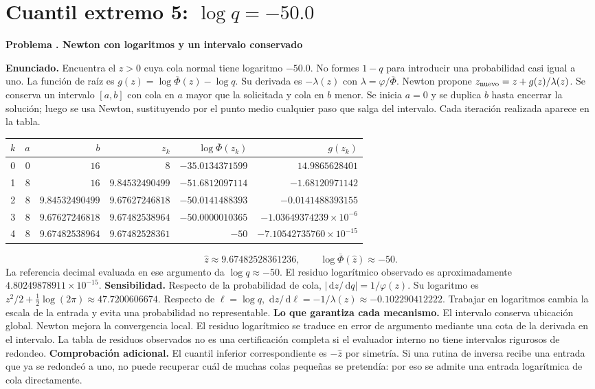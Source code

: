 \documentclass[11pt,a4paper]{article}
\newcommand{\dd}{\,\mathrm d}
\theoremstyle{definition}
\newcounter{problema}
\newenvironment{resuelto}[1]{\refstepcounter{problema}\par\medskip\Needspace{6\baselineskip}\textbf{Problema \theproblema. #1}\par}{\par\medskip}
\newcommand{\SF}{\overline\Phi}
\begin{document}
\section{\texorpdfstring{Cuantil extremo 5: $\log q=-50.0$}{Cuantil extremo 5: log q=-50.0}}
\begin{resuelto}{Newton con logaritmos y un intervalo conservado}
\textbf{Enunciado.} Encuentra el $z>0$ cuya cola normal tiene logaritmo $-50.0$. No formes $1-q$ para introducir una probabilidad casi igual a uno.
La función de raíz es $g(z)=\log\SF(z)-\log q$. Su derivada es $-\lambda(z)$ con $\lambda=\varphi/\SF$. Newton propone $z_{\rm nuevo}=z+g(z)/\lambda(z)$. Se conserva un intervalo $[a,b]$ con cola en $a$ mayor que la solicitada y cola en $b$ menor.
Se inicia $a=0$ y se duplica $b$ hasta encerrar la solución; luego se usa Newton, sustituyendo por el punto medio cualquier paso que salga del intervalo. Cada iteración realizada aparece en la tabla.

\begin{center}\small\begin{tabular}{rrrrrr}
\toprule
$k$&$a$&$b$&$z_k$&$\log\SF(z_k)$&$g(z_k)$\\
\midrule
0&$0$&$16$&$8$&$-35.0134371599$&$14.9865628401$\\
1&$8$&$16$&$9.84532490499$&$-51.6812097114$&$-1.68120971142$\\
2&$8$&$9.84532490499$&$9.67627246818$&$-50.0141488393$&$-0.0141488393155$\\
3&$8$&$9.67627246818$&$9.67482538964$&$-50.0000010365$&$-1.03649374239\times10^{-6}$\\
4&$8$&$9.67482538964$&$9.67482528361$&$-50$&$-7.10542735760\times10^{-15}$\\
\bottomrule\end{tabular}\end{center}
\[
\widehat z\approx9.67482528361236,\qquad \log\SF(\widehat z)\approx-50.
\]
La referencia decimal evaluada en ese argumento da $\log q\approx-50$. El residuo logarítmico observado es aproximadamente $4.80249878911\times10^{-15}$.
\textbf{Sensibilidad.} Respecto de la probabilidad de cola, $|\dd z/\dd q|=1/\varphi(z)$. Su logaritmo es $z^2/2+\tfrac12\log(2\pi)\approx47.7200606674$. Respecto de $\ell=\log q$, $\dd z/\dd\ell=-1/\lambda(z)\approx-0.102290412222$. Trabajar en logaritmos cambia la escala de la entrada y evita una probabilidad no representable.
\textbf{Lo que garantiza cada mecanismo.} El intervalo conserva ubicación global. Newton mejora la convergencia local. El residuo logarítmico se traduce en error de argumento mediante una cota de la derivada en el intervalo. La tabla de residuos observados no es una certificación completa si el evaluador interno no tiene intervalos rigurosos de redondeo.
\textbf{Comprobación adicional.} El cuantil inferior correspondiente es $-\widehat z$ por simetría. Si una rutina de inversa recibe una entrada que ya se redondeó a uno, no puede recuperar cuál de muchas colas pequeñas se pretendía: por eso se admite una entrada logarítmica de cola directamente.
\end{resuelto}
\end{document}
